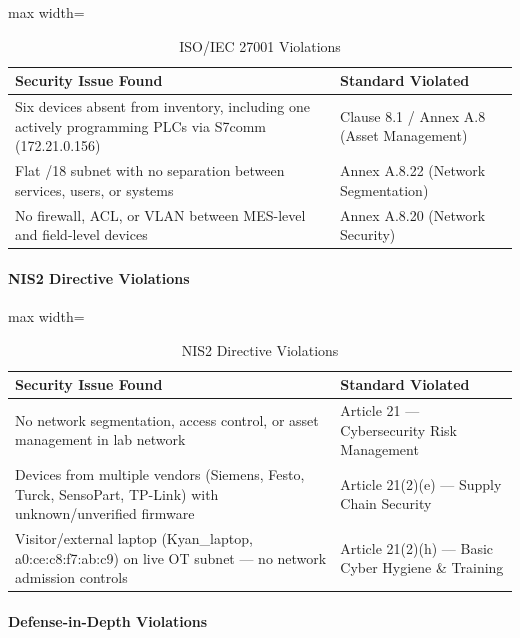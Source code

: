 \begin{table}[H]
\centering
\begin{adjustbox}{max width=\textwidth}
\begin{tabular}{@{}p{}p{}@{}}
\toprule
\textbf{Security Issue Found} & \textbf{Standard Violated} \\
\midrule
Six devices absent from inventory, including one actively programming PLCs via S7comm (172.21.0.156) & Clause 8.1 / Annex A.8 (Asset Management) \\
Flat /18 subnet with no separation between services, users, or systems & Annex A.8.22 (Network Segmentation) \\
No firewall, ACL, or VLAN between MES-level and field-level devices & Annex A.8.20 (Network Security) \\
\bottomrule
\end{tabular}
\end{adjustbox}
\caption{ISO/IEC 27001 Violations}
\end{table}

\paragraph{NIS2 Directive Violations}

\begin{table}[H]
\centering
\begin{adjustbox}{max width=\textwidth}
\begin{tabular}{@{}p{}p{}@{}}
\toprule
\textbf{Security Issue Found} & \textbf{Standard Violated} \\
\midrule
No network segmentation, access control, or asset management in lab network & Article 21 — Cybersecurity Risk Management \\
Devices from multiple vendors (Siemens, Festo, Turck, SensoPart, TP-Link) with unknown/unverified firmware & Article 21(2)(e) — Supply Chain Security \\
Visitor/external laptop (Kyan\_laptop, a0:ce:c8:f7:ab:c9) on live OT subnet — no network admission controls & Article 21(2)(h) — Basic Cyber Hygiene \& Training \\
\bottomrule
\end{tabular}
\end{adjustbox}
\caption{NIS2 Directive Violations}
\end{table}

\paragraph{Defense-in-Depth Violations}

